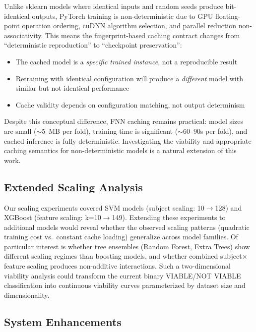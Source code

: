 Unlike sklearn models where identical inputs and random seeds produce bit-identical outputs, PyTorch training is non-deterministic due to GPU floating-point operation ordering, cuDNN algorithm selection, and parallel reduction non-associativity. This means the fingerprint-based caching contract changes from ``deterministic reproduction'' to ``checkpoint preservation'':

\begin{itemize}
    \item The cached model is a \emph{specific trained instance}, not a reproducible result
    \item Retraining with identical configuration will produce a \emph{different} model with similar but not identical performance
    \item Cache validity depends on configuration matching, not output determinism
\end{itemize}

Despite this conceptual difference, FNN caching remains practical: model sizes are small ($\sim$5~MB per fold), training time is significant ($\sim$60--90s per fold), and cached inference is fully deterministic. Investigating the viability and appropriate caching semantics for non-deterministic models is a natural extension of this work.

\subsection{Extended Scaling Analysis}
\label{subsec:future_scaling}

Our scaling experiments covered SVM models (subject scaling: 10$\rightarrow$128) and XGBoost (feature scaling: k=10$\rightarrow$149). Extending these experiments to additional models would reveal whether the observed scaling patterns (quadratic training cost vs.\ constant cache loading) generalize across model families. Of particular interest is whether tree ensembles (Random Forest, Extra Trees) show different scaling regimes than boosting models, and whether combined subject$\times$feature scaling produces non-additive interactions. Such a two-dimensional viability analysis could transform the current binary VIABLE/NOT VIABLE classification into continuous viability curves parameterized by dataset size and dimensionality.

\subsection{System Enhancements}
\label{subsec:future_system}

